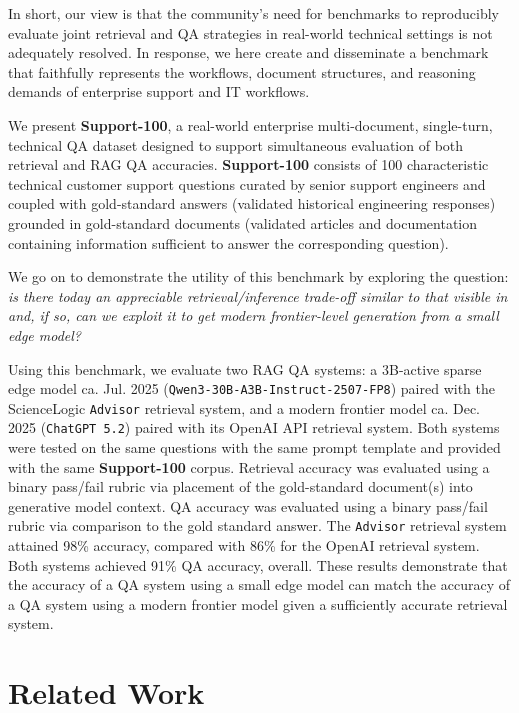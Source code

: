 \documentclass[11pt]{article}
\begin{document}
In short, our view is that the community's need for benchmarks to reproducibly 
evaluate joint retrieval and QA strategies in real-world 
technical settings is not adequately resolved. In response, we here 
create and disseminate a benchmark that faithfully represents the workflows, 
document structures, and reasoning demands of enterprise support and IT 
workflows.

We present \textbf{Support-100}, a real-world enterprise
multi-document, single-turn, technical QA dataset 
designed to support simultaneous evaluation of both retrieval and RAG QA 
accuracies. \textbf{Support-100} consists of 100 characteristic technical customer 
support questions curated by senior support engineers and coupled with
gold-standard answers (validated historical engineering
responses) grounded in gold-standard documents (validated articles and 
documentation containing information sufficient to answer the 
corresponding question).

We go on to demonstrate the utility of this benchmark by exploring 
the question: \textit{is there today an appreciable retrieval/inference 
trade-off similar to that visible in \citep{izacard2023} and, if so, can we exploit it to get modern 
frontier-level generation from a small edge model?}

Using this benchmark, we evaluate
two RAG QA systems: a 3B-active sparse edge model ca. Jul. 2025
(\texttt{Qwen3-30B-A3B-Instruct-2507-FP8}) paired with the ScienceLogic 
\texttt{Advisor} retrieval system, and a modern frontier model ca. Dec. 2025 
(\texttt{ChatGPT 5.2}) paired with its OpenAI API retrieval system. Both 
systems were tested on the same questions with the same prompt template 
and provided with the same \textbf{Support-100} corpus. Retrieval accuracy was
evaluated using a binary pass/fail rubric via placement of the
gold-standard document(s) into generative model context. QA accuracy was 
evaluated using a binary pass/fail rubric via comparison to the gold 
standard answer. The \texttt{Advisor} retrieval system attained 98\% accuracy, 
compared with 86\% for the OpenAI retrieval system. Both systems achieved 
91\% QA accuracy, overall. These results demonstrate that the accuracy of 
a QA system using a small edge model can match the accuracy of a QA 
system using a modern frontier model given a sufficiently accurate 
retrieval system.

\section{Related Work}
\end{document}
